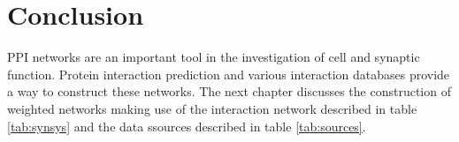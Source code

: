 \section*{Conclusion}

\ac{PPI} networks are an important tool in the investigation of cell and synaptic function.
Protein interaction prediction and various interaction databases provide a way to construct these networks.
The next chapter discusses the construction of weighted networks making use of the interaction network described in table \ref{tab:synsys} and the data ssources described in table \ref{tab:sources}.
